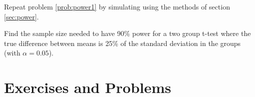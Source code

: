 \begin{problem}
Repeat problem \ref{prob:power1} by simulating using the methods of section \ref{sec:power}.
\end{problem}

\begin{problem}
Find the sample size needed to have 90\% power for a two group t-test
where the true 
difference between means is 25\% of the standard deviation in the groups
(with $\alpha=0.05$).
\end{problem}
\begin{solution}
\begin{knitrout}
\end{knitrout}

\end{solution}


\section{Exercises and Problems}

\shipoutProblems



